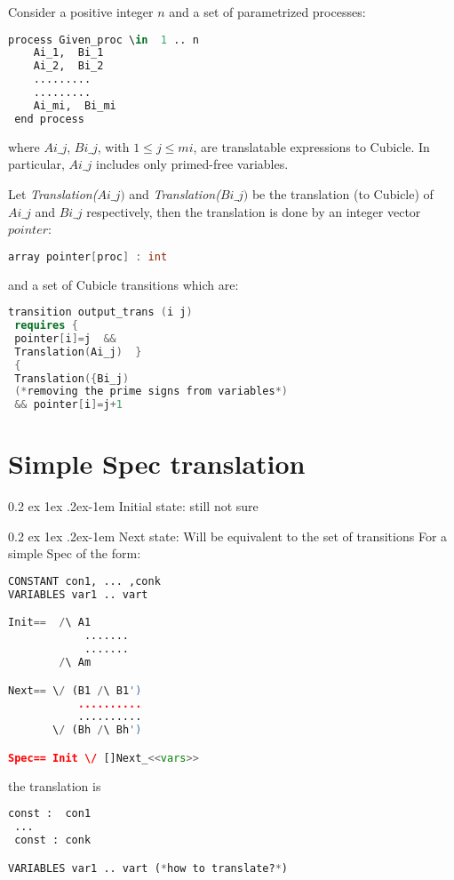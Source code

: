 \documentclass{article}
\makeatletter
\renewcommand{\paragraph}{%
  \@startsection{paragraph}{4}%
  {\z@}{0.2 ex \@plus 1ex \@minus .2ex}{-1em}%
  {\normalfont\normalsize\bfseries}
}
\theoremstyle{plain}
\numberwithin{equation}{section}
\renewcommand{\leq}{\leqslant}
\makeatother
\begin{document}
\large


  

Consider a positive integer $n$ and a  set of parametrized   processes: 

\begin{lstlisting}[language=Python]
 process Given_proc \in  1 .. n   
    Ai_1,  Bi_1 
    Ai_2,  Bi_2
    .........
    .........
    Ai_mi,  Bi_mi
 end process    

\end{lstlisting}
where  \emph{$Ai\_j$},  \emph{$Bi\_j$}, with $1\leq j\leq mi$,  are  translatable expressions to Cubicle. In particular, 
\emph{$Ai\_j$}  includes only primed-free variables.   


Let \emph{Translation($Ai\_j)$} and \emph{Translation($Bi\_j)$} be the translation (to Cubicle) of $Ai\_j$ and $Bi\_j$ respectively, then  the translation is  done by an integer vector \emph{$pointer$}:

\begin{lstlisting}[language=C++]
array pointer[proc] : int
\end{lstlisting}


 and a set of Cubicle transitions which are: 
\begin{lstlisting}[language=C++]
transition output_trans (i j) 
 requires {  
 pointer[i]=j  && 
 Translation(Ai_j)  }     
 { 
 Translation({Bi_j) 
 (*removing the prime signs from variables*)
 && pointer[i]=j+1 
\end{lstlisting}

\section*{Simple Spec translation}


\paragraph{Initial state}: still not sure 


\paragraph{Next state:} Will be equivalent to the set of transitions
For a simple Spec of the form: 
\begin{lstlisting}[language=Python]
CONSTANT con1, ... ,conk
VARIABLES var1 .. vart

Init==  /\ A1 
            .......
            .......
        /\ Am

Next== \/ (B1 /\ B1')
           ..........
           ..........
       \/ (Bh /\ Bh')    

Spec== Init \/ []Next_<<vars>>
\end{lstlisting}


the translation is 


\begin{lstlisting}[language=Python]
const :  con1
 ... 
 const : conk

VARIABLES var1 .. vart (*how to translate?*)
 

\end{lstlisting}





\end{document}
